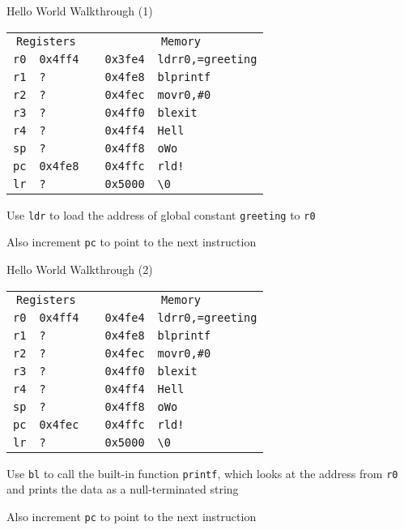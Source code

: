 \begin{frame}{Hello World Walkthrough (1)}
    \begin{alltt}
        \begin{tabular}{ r | l p{5mm} r | l }
            \multicolumn{2}{c}{Registers} && \multicolumn{2}{c}{Memory} \\
            r0 & 0x4ff4 && 0x3fe4 & ldr r0, =greeting \\
            r1 & ? && 0x4fe8 & bl printf \\
            r2 & ? && 0x4fec & mov r0, \#0 \\
            r3 & ? && 0x4ff0 & bl exit \\
            r4 & ? && 0x4ff4 & Hell \\
            sp & ? && 0x4ff8 & o Wo \\
            pc & 0x4fe8 && 0x4ffc & rld! \\
            lr & ? && 0x5000 & {\textbackslash}0 \\
            \end{tabular}
        \end{alltt}

        Use \texttt{ldr} to load the address of global constant \texttt{greeting} to \texttt{r0}
        
        Also increment \texttt{pc} to point to the next instruction

\end{frame}

\begin{frame}{Hello World Walkthrough (2)}
    \begin{alltt}
        \begin{tabular}{ r | l p{5mm} r | l }
            \multicolumn{2}{c}{Registers} && \multicolumn{2}{c}{Memory} \\
            r0 & 0x4ff4 && 0x4fe4 & ldr r0, =greeting \\
            r1 & ? && 0x4fe8 & bl printf \\
            r2 & ? && 0x4fec & mov r0, \#0 \\
            r3 & ? && 0x4ff0 & bl exit \\
            r4 & ? && 0x4ff4 & Hell \\
            sp & ? && 0x4ff8 & o Wo \\
            pc & 0x4fec && 0x4ffc & rld! \\
            lr & ? && 0x5000 & {\textbackslash}0 \\
            \end{tabular}
        \end{alltt}

        Use \texttt{bl} to call the built-in function \texttt{printf}, which looks at the address from \texttt{r0} and prints the data as a null-terminated string
        
        Also increment \texttt{pc} to point to the next instruction


\end{frame}


